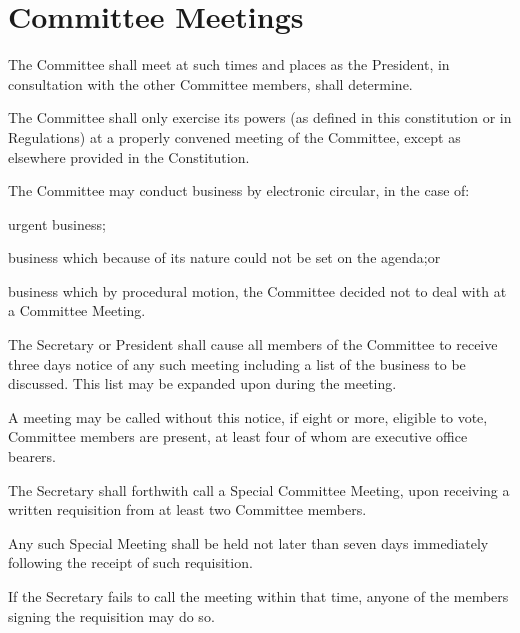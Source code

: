 \documentclass[a4paper]{article}
\begin{document}
\section{Committee Meetings} \label{sec:committee_meetings}
\begin{myEnumerate}
    \item The Committee shall meet at such times and places as the President, in consultation with the other Committee members, shall determine.
    \item The Committee shall only exercise its powers (as defined in this constitution or in Regulations) at a properly convened meeting of the Committee, except as elsewhere provided in the Constitution.
    \item The Committee may conduct business by electronic circular, in the case of:
        \begin{myEnumerate}
            \item urgent business;
            \item business which because of its nature could not be set on the agenda;or
            \item business which by procedural motion, the Committee decided not to deal with at a Committee Meeting.
        \end{myEnumerate}
    \item The Secretary or President shall cause all members of the Committee to receive three days notice of any such meeting including a list of the business to be discussed. This list may be expanded upon during the meeting.
        \begin{myEnumerate}
            \item A meeting may be called without this notice, if eight or more, eligible to vote, Committee members are present, at least four of whom are executive office bearers.
        \end{myEnumerate}
    \item The Secretary shall forthwith call a Special Committee Meeting, upon receiving a written requisition from at least two Committee members.
        \begin{myEnumerate}
            \item Any such Special Meeting shall be held not later than seven days immediately following the receipt of such requisition.
                \begin{myEnumerate}
                    \item If the Secretary fails to call the meeting within that time, anyone of the members signing the requisition may do so.

\end{myEnumerate}
\end{myEnumerate}
\end{myEnumerate}
\end{document}
